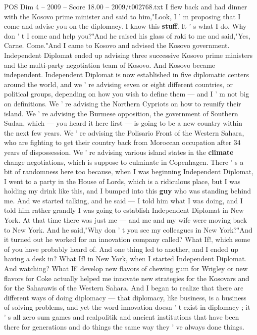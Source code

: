 \begin{textsample}{POS Dim 4 – 2009 – Score 18.00 – 2009/t002768.txt}
I flew back and had dinner with the Kosovo prime minister and said to him,"Look, I ' m proposing that I come and advise you on the diplomacy.
I know this \textbf{stuff}.
It ' s what I do.
Why don ' t I come and help you?"And he raised his glass of raki to me and said,"Yes, Carne.
Come."And I came to Kosovo and advised the Kosovo government.
Independent Diplomat ended up advising three successive Kosovo prime ministers and the multi-party negotiation team of Kosovo.
And Kosovo became independent.
Independent Diplomat is now established in five diplomatic centers around the world, and we ' re advising seven or eight different countries, or political groups, depending on how you wish to define them — and I ' m not big on definitions.
We ' re advising the Northern Cypriots on how to reunify their island.
We ' re advising the Burmese opposition, the government of Southern Sudan, which — you heard it here first — is going to be a new country within the next few years.
We ' re advising the Polisario Front of the Western Sahara, who are fighting to get their country back from Moroccan occupation after 34 years of dispossession.
We ' re advising various island states in the \textbf{climate} change negotiations, which is suppose to culminate in Copenhagen.
There ' s a bit of randomness here too because, when I was beginning Independent Diplomat, I went to a party in the House of Lords, which is a ridiculous place, but I was holding my drink like this, and I bumped into this \textbf{guy} who was standing behind me.
And we started talking, and he said — I told him what I was doing, and I told him rather grandly I was going to establish Independent Diplomat in New York.
At that time there was just me — and me and my wife were moving back to New York.
And he said,"Why don ' t you see my colleagues in New York?"And it turned out he worked for an innovation company called?
What If!, which some of you have probably heard of.
And one thing led to another, and I ended up having a desk in?
What If! in New York, when I started Independent Diplomat.
And watching?
What If! develop new flavors of chewing gum for Wrigley or new flavors for Coke actually helped me innovate new strategies for the Kosovars and for the Saharawis of the Western Sahara.
And I began to realize that there are different ways of doing diplomacy — that diplomacy, like business, is a business of solving problems, and yet the word innovation doesn ' t exist in diplomacy ; it ' s all zero sum games and realpolitik and ancient institutions that have been there for generations and do things the same way they ' ve always done things.

\end{textsample}
